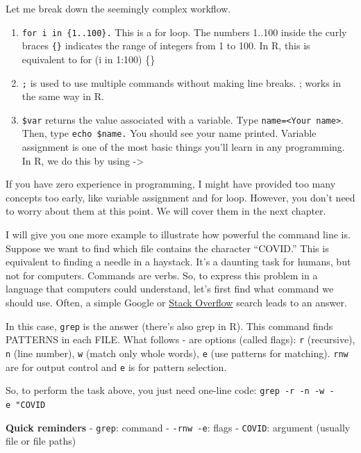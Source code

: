 \documentclass[
  letterpaper,
  DIV=11,
  numbers=noendperiod]{scrreprt}
\begin{document}
Let me break down the seemingly complex workflow.

\begin{enumerate}
\def\labelenumi{\arabic{enumi}.}
\item
  \texttt{for\ i\ in\ \{1..100\}.} This is a for loop. The numbers
  1..100 inside the curly braces \texttt{\{\}} indicates the range of
  integers from 1 to 100. In R, this is equivalent to for (i in 1:100)
  \{\}\\
\item
  \texttt{;} is used to use multiple commands without making line
  breaks. ; works in the same way in R.
\item
  \texttt{\$var} returns the value associated with a variable. Type
  \texttt{name=\textless{}Your\ name\textgreater{}}. Then, type
  \texttt{echo\ \$name.} You should see your name printed. Variable
  assignment is one of the most basic things you'll learn in any
  programming. In R, we do this by using -\textgreater{}
\end{enumerate}

If you have zero experience in programming, I might have provided too
many concepts too early, like variable assignment and for loop. However,
you don't need to worry about them at this point. We will cover them in
the next chapter.

I will give you one more example to illustrate how powerful the command
line is. Suppose we want to find which file contains the character
``COVID.'' This is equivalent to finding a needle in a haystack. It's a
daunting task for humans, but not for computers. Commands are verbs. So,
to express this problem in a language that computers could understand,
let's first find what command we should use. Often, a simple Google or
\href{https://stackoverflow.com/}{Stack Overflow} search leads to an
answer.

In this case, \texttt{grep} is the answer (there's also grep in R). This
command finds PATTERNS in each FILE. What follows - are options (called
flags): \texttt{r} (recursive), \texttt{n} (line number), \texttt{w}
(match only whole words), \texttt{e} (use patterns for matching).
\texttt{rnw} are for output control and \texttt{e} is for pattern
selection.

So, to perform the task above, you just need one-line code:
\texttt{grep\ -r\ -n\ -w\ -e\ "COVID\textquotesingle{}\textquotesingle{}}

\textbf{Quick reminders} - \texttt{grep}: command - \texttt{-rnw\ -e}:
flags - \texttt{COVID}: argument (usually file or file paths)
\end{document}
